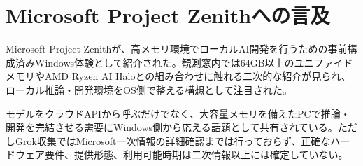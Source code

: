 \section{Microsoft Project Zenithへの言及}

Microsoft Project Zenithが、高メモリ環境でローカルAI開発を行うための事前構成済みWindows体験として紹介された。観測窓内では64GB以上のユニファイドメモリやAMD Ryzen AI Haloとの組み合わせに触れる二次的な紹介が見られ、ローカル推論・開発環境をOS側で整える構想として注目された。

モデルをクラウドAPIから呼ぶだけでなく、大容量メモリを備えたPCで推論・開発を完結させる需要にWindows側から応える話題として共有されている。ただしGrok収集ではMicrosoft一次情報の詳細確認までは行っておらず、正確なハードウェア要件、提供形態、利用可能時期は二次情報以上には確定していない。

